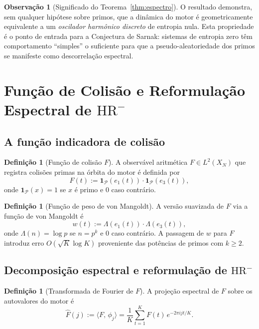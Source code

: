 \documentclass[12pt,a4paper]{article}
\theoremstyle{definition}
\newtheorem{definition}[theorem]{Definição}
\newtheorem{remark}[theorem]{Observação}
\newcommand{\PP}{\mathcal{P}}          %
\newcommand{\HRm}{\mathrm{HR}^{-}}
\newcommand{\ip}[2]{\langle #1,\, #2 \rangle}
\begin{document}
	\begin{remark}[Significado do Teorema~\ref{thm:espectro}]
		O resultado demonstra, sem qualquer hipótese sobre primos, que a
		dinâmica do motor é geometricamente equivalente a um \emph{oscilador
			harmônico discreto} de entropia nula. Esta propriedade é o ponto de
		entrada para a Conjectura de Sarnak: sistemas de entropia zero têm
		comportamento ``simples'' o suficiente para que a pseudo-aleatoriedade
		dos primos se manifeste como descorrelação espectral.
	\end{remark}
	
	\section{Função de Colisão e Reformulação Espectral de \texorpdfstring{$\HRm$}{HR-}}
	\label{sec:colisao}
	
	\subsection{A função indicadora de colisão}
	
	\begin{definition}[Função de colisão $F$]
		\label{def:colisao}
		A observável aritmética $F \in L^2(X_N)$ que registra colisões primas
		na órbita do motor é definida por
		\[
		F(t) := \mathbf{1}_{\PP}(e_1(t))\cdot\mathbf{1}_{\PP}(e_3(t)),
		\]
		onde $\mathbf{1}_{\PP}(x) = 1$ se $x$ é primo e $0$ caso contrário.
	\end{definition}
	
	\begin{definition}[Função de peso de von Mangoldt]
		\label{def:mangoldt}
		A versão suavizada de $F$ via a função de von Mangoldt é
		\[
		w(t) := \Lambda(e_1(t))\cdot\Lambda(e_3(t)),
		\]
		onde $\Lambda(n) = \log p$ se $n = p^k$ e $0$ caso contrário. A
		passagem de $w$ para $F$ introduz erro $O(\sqrt{K}\log K)$ proveniente
		das potências de primos com $k \geq 2$.
	\end{definition}
	
	\subsection{Decomposição espectral e reformulação de \texorpdfstring{$\HRm$}{HR-}}
	
	\begin{definition}[Transformada de Fourier de $F$]
		A projeção espectral de $F$ sobre os autovalores do motor é
		\[
		\widehat{F}(j) := \ip{F}{\phi_j} = \frac{1}{K}\sum_{t=1}^{K}
		F(t)\,e^{-2\pi i j t/K}.
		\]
	\end{definition}
	
\end{document}
